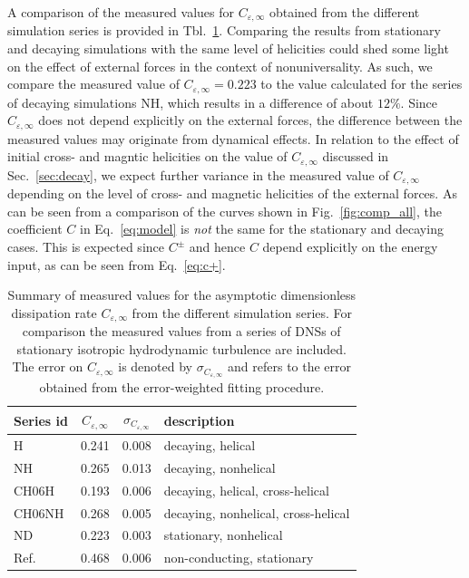 \documentclass[aps,pre,onecolumn,superscriptaddress,notitlepage]{revtex4-1}
\newcommand{\Cinf}{C_{\varepsilon,\infty}}
\begin{document}
A comparison of the measured values for $\Cinf$ 
obtained from the 
different simulation series is provided in Tbl.~\ref{tbl:cinf_summary}.     
Comparing the results from stationary and decaying simulations with 
the same level of helicities could shed some light on the effect of 
external forces in the context of nonuniversality. As such, we compare
the measured value of $\Cinf=0.223$ to the value calculated for the series 
of decaying simulations NH, which results in a difference of about $12 \%$.
Since $\Cinf$ does not depend explicitly on the external forces, the difference 
between the measured values may originate from dynamical effects. In relation to the 
effect of initial cross- and magntic helicities on the value of $\Cinf$ discussed in Sec.~\ref{sec:decay}, 
we expect further variance in the measured value of $\Cinf$ depending on the 
level of cross- and magnetic helicities of the external forces.
As can be seen from a comparison of the curves shown in Fig.~\ref{fig:comp_all}, 
the coefficient $C$ in Eq.~\eqref{eq:model} is {\em not} the same for the stationary and 
decaying cases. This is expected since $C^\pm$ and hence $C$ 
depend explicitly on the energy input, as can be seen from Eq.~\eqref{eq:c+}.

 \begin{table}[h]
 \begin{center}
 \begin{tabular}{lccl}
   Series id & $\Cinf$  & $\sigma_{\Cinf}$  &description \\
  \hline
   H & 0.241 & 0.008 &  decaying, helical \\
   NH & 0.265 & 0.013 &  decaying, nonhelical \\
   CH06H & 0.193 & 0.006 &  decaying, helical, cross-helical \\
   CH06NH & 0.268 & 0.005 &  decaying, nonhelical, cross-helical \\
   ND & 0.223 & 0.003 &  stationary, nonhelical \\
   Ref.~\cite{McComb15a} & 0.468 & 0.006 &  non-conducting, stationary 
  \end{tabular}
  \end{center}
 \caption{
Summary of measured values for the asymptotic dimensionless dissipation rate $\Cinf$  
from the different simulation series. For comparison the measured values
from a series of DNSs of stationary isotropic hydrodynamic turbulence \cite{McComb15a} are included.
The error on $\Cinf$  is denoted by $\sigma_{\Cinf}$ and refers to the error obtained
from the error-weighted fitting procedure.
 }
 \label{tbl:cinf_summary}
 \end{table}
\end{document}
